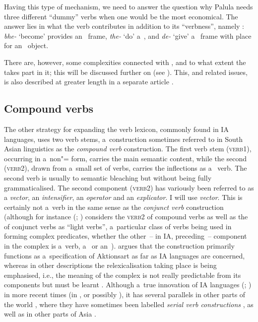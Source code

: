 \begin{exe}
Having this type of mechanism, we need to answer the question why Palula needs three different ``dummy'' verbs when one would be the most economical. The answer lies in what the verb contributes in addition to its ``verbness'', namely : \textit{bhe-} `become' provides an~ frame, \textit{the-} `do' a~, and \textit{de-} `give' a~ frame with place for an~ object. 


There are, however, some complexities connected with , and to what extent the  takes part in it; this will be discussed further on (see ). This, and related issues, is also described at greater length in a separate article \citep{liljegren2010}.


\subsection{Compound verbs}
\label{subsec:8-6-2}

The other strategy for expanding the verb lexicon, commonly found in IA languages, uses two verb stems, a~construction sometimes referred to in South Asian linguistics \citep[326]{masica1991} as the \textit{compound verb} construction. The first verb stem (\textsc{verb1}), occurring in a~non"= form, carries the main semantic content, while the second (\textsc{verb2}), drawn from a~small set of verbs, carries the inflections as a~ verb. The second verb is usually  to semantic bleaching but without being fully grammaticalised. The second component (\textsc{verb2}) has variously been referred to as a \textit{vector}, an \textit{intensifier}, an \textit{operator} and an \textit{explicator}. I will use \textit{vector}. This is certainly not a~verb  in the same sense as the \textit{conjunct verb} construction (although for instance \citeauthor{butt1993} (\citeyear[31]{butt1993}; \citeyear[49]{butt2010}) considers the \textsc{verb2} of compound verbs as well as the  of conjunct verbs as ``light verbs'', a~particular class of verbs being used in forming complex predicates, whether the other~-- in IA, preceding~-- component in the complex is a~verb, a~ or an~). \citet[326--330]{masica1991} argues that the construction primarily functions as a~specification of Aktionsart as far as IA languages are concerned, whereas in other descriptions the relexicalisation taking place is being emphasised, i.e., the meaning of the complex is not really predictable from its components but must be learnt \citep[143]{schmidt1999}. Although a~true innovation of IA languages (\citealt[326]{masica1991}; \citealt{hook1977}) in more recent times (in \iliNIA, or possibly \iliMIA), it has several parallels in other parts of the world \citep[348--349]{hook1977}, where they have sometimes been labelled \textit{serial verb constructions} \citep{ansaldo2006}, as well as in other parts of Asia \citep[559]{ebert2006}. 




\end{exe}
